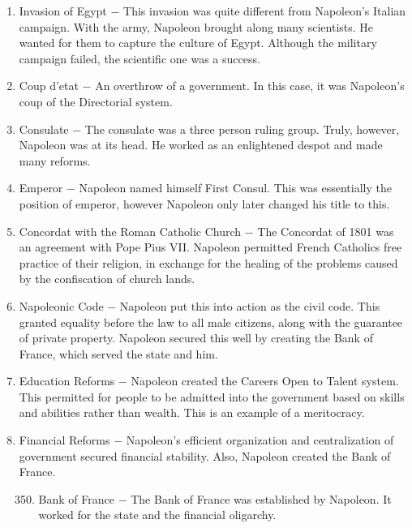 \documentclass[12pt]{article}
\begin{document}
\begin{enumerate}
\item Invasion of Egypt $-$ This invasion was quite different from Napoleon's Italian campaign. With the army, Napoleon brought along many scientists. He wanted for them to capture the culture of Egypt. Although the military campaign failed, the scientific one was a success.

\item Coup d'etat $-$ An overthrow of a government. In this case, it was Napoleon's coup of the Directorial system.

\item Consulate $-$ The consulate was a three person ruling group. Truly, however, Napoleon was at its head. He worked as an enlightened despot and made many reforms.

\item Emperor $-$ Napoleon named himself First Consul. This was essentially the position of emperor, however Napoleon only later changed his title to this.

\item Concordat with the Roman Catholic Church $-$ The Concordat of 1801 was an agreement with Pope Pius VII. Napoleon permitted French Catholics free practice of their religion, in exchange for the healing of the problems caused by the confiscation of church lands.

\item Napoleonic Code $-$ Napoleon put this into action as the civil code. This granted equality before the law to all male citizens, along with the guarantee of private property. Napoleon secured this well by creating the Bank of France, which served the state and him.

\item Education Reforms $-$ Napoleon created the Careers Open to Talent system. This permitted for people to be admitted into the government based on skills and abilities rather than wealth. This is an example of a meritocracy.

\item Financial Reforms $-$ Napoleon's efficient organization and centralization of government secured financial stability. Also, Napoleon created the Bank of France.

\begin{enumerate}[label=\arabic{*}.]
\setcounter{enumii}{349}

\item Bank of France $-$ The Bank of France was established by Napoleon. It worked for the state and the financial oligarchy.


\end{enumerate}
\end{enumerate}
\end{document}
